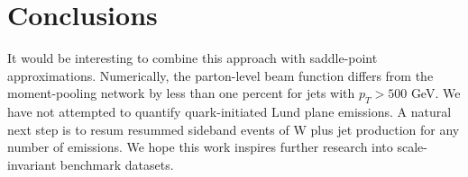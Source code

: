 \section{Conclusions}\label{sec:conclusions}

It would be interesting to combine this approach with saddle-point
approximations. Numerically, the parton-level beam function differs from
the moment-pooling network by less than one percent for jets with $p_T >
500$ GeV. We have not attempted to quantify quark-initiated Lund plane
emissions. A natural next step is to resum resummed sideband events of W
plus jet production for any number of emissions. We hope this work
inspires further research into scale-invariant benchmark datasets.

